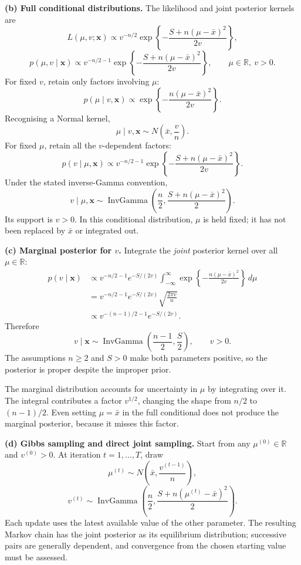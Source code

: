 \documentclass[11pt,a4paper]{article}
\newcommand{\given}{\mathrel{|}}
\newcommand{\xvec}{\boldsymbol{x}}
\DeclareMathOperator{\InvGamma}{InvGamma}
\begin{document}
\textbf{(b) Full conditional distributions.}
The likelihood and joint posterior kernels are
\[
L(\mu,v;\xvec)\propto
v^{-n/2}\exp\left\{-\frac{S+n(\mu-\bar x)^2}{2v}\right\},
\]
\[
p(\mu,v\given\xvec)\propto
v^{-n/2-1}\exp\left\{-\frac{S+n(\mu-\bar x)^2}{2v}\right\},
\qquad \mu\in\mathbb R,\ v>0.
\]
For fixed $v$, retain only factors involving $\mu$:
\[
p(\mu\given v,\xvec)\propto
\exp\left\{-\frac{n(\mu-\bar x)^2}{2v}\right\}.
\]
Recognising a Normal kernel,
\[
\boxed{\mu\given v,\xvec\sim N\!\left(\bar x,\frac vn\right).}
\]
For fixed $\mu$, retain all the $v$-dependent factors:
\[
p(v\given\mu,\xvec)\propto
v^{-n/2-1}\exp\left\{-\frac{S+n(\mu-\bar x)^2}{2v}\right\}.
\]
Under the stated inverse-Gamma convention,
\[
\boxed{
v\given\mu,\xvec\sim
\InvGamma\!\left(\frac n2,\frac{S+n(\mu-\bar x)^2}{2}\right).
}
\]
Its support is $v>0$. In this conditional distribution, $\mu$ is held
fixed; it has not been replaced by $\bar x$ or integrated out.

\textbf{(c) Marginal posterior for $v$.}
Integrate the \emph{joint} posterior kernel over all $\mu\in\mathbb R$:
\begin{align*}
p(v\given\xvec)
&\propto v^{-n/2-1}e^{-S/(2v)}
\int_{-\infty}^{\infty}
\exp\left\{-\frac{n(\mu-\bar x)^2}{2v}\right\}\,d\mu\\
&=v^{-n/2-1}e^{-S/(2v)}\sqrt{\frac{2\pi v}{n}}\\
&\propto v^{-(n-1)/2-1}e^{-S/(2v)}.
\end{align*}
Therefore
\[
\boxed{v\given\xvec\sim\InvGamma\!\left(\frac{n-1}{2},\frac S2\right),
\qquad v>0.}
\]
The assumptions $n\ge2$ and $S>0$ make both parameters positive, so the
posterior is proper despite the improper prior.

The marginal distribution accounts for uncertainty in $\mu$ by integrating
over it. The integral contributes a factor $v^{1/2}$, changing the shape
from $n/2$ to $(n-1)/2$. Even setting $\mu=\bar x$ in the full conditional
does not produce the marginal posterior, because it misses this factor.

\textbf{(d) Gibbs sampling and direct joint sampling.}
Start from any $\mu^{(0)}\in\mathbb R$ and $v^{(0)}>0$. At iteration
$t=1,\ldots,T$, draw
\[
\mu^{(t)}\sim N\!\left(\bar x,\frac{v^{(t-1)}}n\right),
\]
\[
v^{(t)}\sim\InvGamma\!\left(
\frac n2,\frac{S+n(\mu^{(t)}-\bar x)^2}{2}\right).
\]
Each update uses the latest available value of the other parameter.
The resulting Markov chain has the joint posterior as its equilibrium
distribution; successive pairs are generally dependent, and convergence
from the chosen starting value must be assessed.
\end{document}
